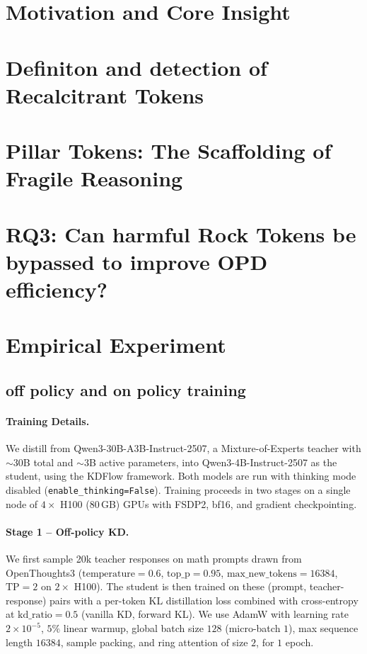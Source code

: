 \documentclass{article}
\begin{document}
\section{Motivation and Core Insight}


\section{Definiton and detection of Recalcitrant Tokens}






\section{Pillar Tokens: The Scaffolding of Fragile Reasoning}




\section{RQ3: Can harmful Rock Tokens be bypassed to improve OPD efficiency?}



\section{Empirical Experiment}
\subsection{off policy and on policy training}

\paragraph{Training Details.} We distill from Qwen3-30B-A3B-Instruct-2507, a Mixture-of-Experts teacher with $\sim$30B total and $\sim$3B active parameters, into Qwen3-4B-Instruct-2507 as the student, using the KDFlow framework. Both models are run with thinking mode disabled (\texttt{enable\_thinking=False}). Training proceeds in two stages on a single node of $4\times$ H100 (80\,GB) GPUs with FSDP2, bf16, and gradient checkpointing.
  
\paragraph{Stage 1 -- Off-policy KD.} We first sample 20k teacher responses on math prompts drawn from OpenThoughts3 ($\text{temperature}=0.6$, $\text{top\_p}=0.95$, $\text{max\_new\_tokens}=16384$, $\text{TP}=2$ on $2\times$ H100). The student is then trained on these (prompt, teacher-response) pairs with a per-token KL distillation loss combined with cross-entropy at $\text{kd\_ratio}=0.5$ (vanilla KD, forward KL). We use AdamW with learning rate $2\times10^{-5}$, $5\%$ linear warmup, global batch size $128$ (micro-batch $1$), max sequence length $16384$, sample packing, and ring attention of size $2$, for $1$ epoch.
\end{document}
